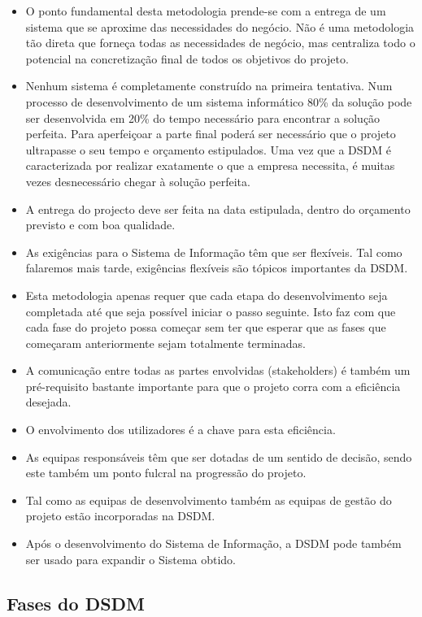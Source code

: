 \begin{itemize}
    \item O ponto fundamental desta metodologia prende-se com a entrega de um sistema que se aproxime das necessidades do negócio. Não é uma metodologia tão direta que forneça todas as necessidades de negócio, mas centraliza todo o potencial na concretização final de todos os objetivos do projeto.
    \item Nenhum sistema é completamente construído na primeira tentativa. Num processo de desenvolvimento de um sistema informático 80\% da solução pode ser desenvolvida em 20\% do tempo necessário para encontrar a solução perfeita. Para aperfeiçoar a parte final poderá ser necessário que o projeto ultrapasse o seu tempo e orçamento estipulados. Uma vez que a DSDM é caracterizada por realizar exatamente o que a empresa necessita, é muitas vezes desnecessário chegar à solução perfeita.
    \item A entrega do projecto deve ser feita na data estipulada, dentro do orçamento previsto e com boa qualidade.
    \item As exigências para o Sistema de Informação têm que ser flexíveis. Tal como falaremos mais tarde, exigências flexíveis são tópicos importantes da DSDM.
    \item Esta metodologia apenas requer que cada etapa do desenvolvimento seja completada até que seja possível iniciar o passo seguinte. Isto faz com que cada fase do projeto possa começar sem ter que esperar que as fases que começaram anteriormente sejam totalmente terminadas.
    \item A comunicação entre todas as partes envolvidas (stakeholders) é também um pré-requisito bastante importante para que o projeto corra com a eficiência desejada.
    \item O envolvimento dos utilizadores é a chave para esta eficiência.
    \item As equipas responsáveis têm que ser dotadas de um sentido de decisão, sendo este também um ponto fulcral na progressão do projeto.
    \item Tal como as equipas de desenvolvimento também as equipas de gestão do projeto estão incorporadas na DSDM.
    \item Após o desenvolvimento do Sistema de Informação, a DSDM pode também ser usado para expandir o Sistema obtido.
\end{itemize}

\subsection{Fases do DSDM}

